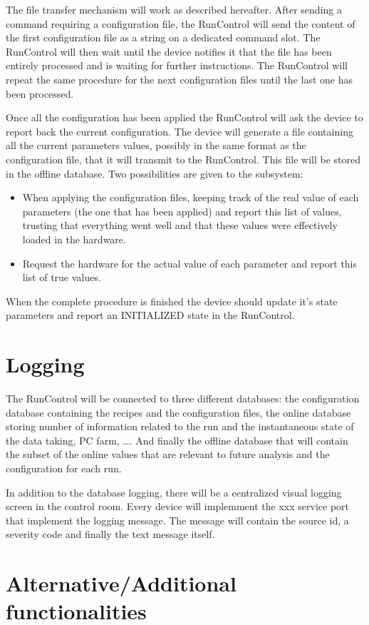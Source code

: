 \documentclass[a4paper]{article}
\begin{document}
The file transfer mechanism will work as described hereafter. After sending a command requiring a
configuration file, the RunControl will send the content of the first configuration file as a
string on a dedicated command slot. The RunControl will then wait until the device notifies it that
the file has been entirely processed and is waiting for further instructions. The RunControl will
repeat the same procedure for the next configuration files until the last one has been processed.

Once all the configuration has been applied the RunControl will ask the device to report back the
current configuration. The device will generate a file containing all the current parameters values,
possibly in the same format as the configuration file, that it will transmit to the RunControl. This
file will be stored in the offline database. Two possibilities are given to the subsystem:
\begin{itemize}
  \item When applying the configuration files, keeping track of the real value of each parameters
  (the one that has been applied) and report this list of values, trusting that everything went well
  and that these values were effectively loaded in the hardware.
  \item Request the hardware for the actual value of each parameter and report this list of true
  values.
\end{itemize}

When the complete procedure is finished the device should update it's state parameters and report an
INITIALIZED state in the RunControl. 

\section{Logging}
The RunControl will be connected to three different databases: the configuration database containing
the recipes and the configuration files, the online database storing number of information related
to the run and the instantaneous state of the data taking, PC farm, \ldots. And finally the offline
database that will contain the subset of the online values that are relevant to future analysis and
the configuration for each run.

In addition to the database logging, there will be a centralized visual logging screen in the
control room. Every device will implemment the xxx service port that implement the logging message.
The message will contain the source id, a severity code and finally the text message itself.

\section{Alternative/Additional functionalities}
\thebibliography{}
 
\end{document}
